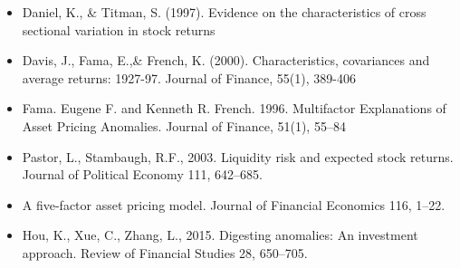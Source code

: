 \documentclass[12pt]{article}
\begin{document}
\begin{itemize}
		\item Daniel, K., \& Titman, S. (1997). Evidence on the characteristics of cross sectional variation in stock returns
		\item Davis, J., Fama, E.,\& French, K. (2000). Characteristics, covariances and average returns: 1927-97. Journal of Finance, 55(1), 389-406
		\item Fama. Eugene F. and Kenneth R. French. 1996. Multifactor Explanations of Asset Pricing Anomalies. Journal of Finance, 51(1), 55--84
		\item Pastor, L., Stambaugh, R.F., 2003. Liquidity risk and expected stock returns. Journal of Political Economy 111, 642–685.
		\item A five-factor asset pricing model. Journal of Financial Economics 116, 1–22.
		\item Hou, K., Xue, C., Zhang, L., 2015. Digesting anomalies: An investment approach. Review of Financial Studies 28, 650–705.
	\end{itemize}
\end{document}
